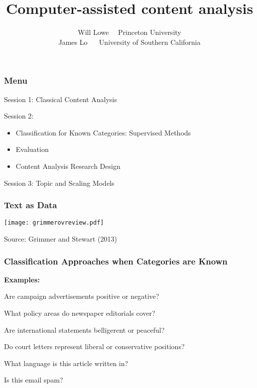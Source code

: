 \documentclass[11pt,compress,professionalfonts]{beamer}
\title{Computer-assisted content analysis}
\author{Will Lowe ~~Princeton University\\James Lo ~~ University of Southern California}
\institute{IQMR 2016 Syracuse}
\newcommand{\ita}{\begin{itemize}}
\newcommand{\itm}{\item[]}
\newcommand{\itz}{\end{itemize}}
\begin{document}
\maketitle


%
%
%
%
%


%


\begin{frame}[t,fragile]\frametitle{Menu}

Session 1: Classical Content Analysis

Session 2:
\ita


\itm Classification for Known Categories: Supervised Methods
\itm Evaluation
\itm Content Analysis Research Design
\itz

Session 3: Topic and Scaling Models


\end{frame}
\begin{frame}[t,fragile]\frametitle{Text as Data}

\centerline{\texttt{[image: grimmerovreview.pdf]}}
\centerline{\footnotesize Source: Grimmer and Stewart (2013)}





\end{frame}
\begin{frame}[t,fragile]\frametitle{Classification Approaches when Categories are Known}

{\bf Examples:}

Are campaign advertisements positive or negative?

What  policy areas do newspaper editorials cover?

Are international statements belligerent or peaceful?

Do court letters represent liberal or conservative positions?

What language is this article written in?

Is this email spam?

\end{frame}
\end{document}
